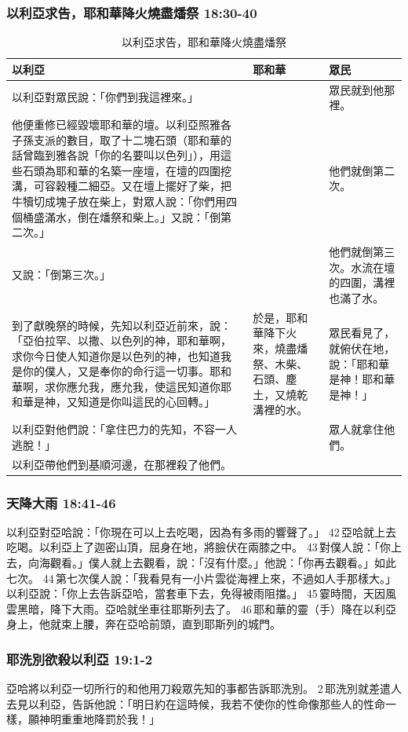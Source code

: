 \subsubsection{以利亞求告，耶和華降火燒盡燔祭 18:30-40}
\begin{table}[H]
\centering 
\begin{tabular}{p{10.5cm}|p{2.75cm}|p{4cm}}\hline\hline
以利亞&耶和華&眾民\\\hline
以利亞對眾民說：「你們到我這裡來。」&&眾民就到他那裡。\\\hline
他便重修已經毀壞耶和華的壇。以利亞照雅各子孫支派的數目，取了十二塊石頭（耶和華的話曾臨到雅各說「你的名要叫以色列」），用這些石頭為耶和華的名築一座壇，在壇的四圍挖溝，可容穀種二細亞。又在壇上擺好了柴，把牛犢切成塊子放在柴上，對眾人說：「你們用四個桶盛滿水，倒在燔祭和柴上。」又說：「倒第二次。」&&他們就倒第二次。\\\hline
又說：「倒第三次。」&&他們就倒第三次。水流在壇的四圍，溝裡也滿了水。\\\hline
到了獻晚祭的時候，先知以利亞近前來，說：「亞伯拉罕、以撒、以色列的神，耶和華啊，求你今日使人知道你是以色列的神，也知道我是你的僕人，又是奉你的命行這一切事。耶和華啊，求你應允我，應允我，使這民知道你耶和華是神，又知道是你叫這民的心回轉。」&於是，耶和華降下火來，燒盡燔祭、木柴、石頭、塵土，又燒乾溝裡的水。&眾民看見了，就俯伏在地，說：「耶和華是神！耶和華是神！」\\\hline
以利亞對他們說：「拿住巴力的先知，不容一人逃脫！」&&眾人就拿住他們。\\\hline
以利亞帶他們到基順河邊，在那裡殺了他們。&&\\\hline
\end{tabular}
\caption{以利亞求告，耶和華降火燒盡燔祭}
\end{table} 


\subsubsection{天降大雨 18:41-46} 
以利亞對亞哈說：「你現在可以上去吃喝，因為有多雨的響聲了。」 42 亞哈就上去吃喝。以利亞上了迦密山頂，屈身在地，將臉伏在兩膝之中。 43 對僕人說：「你上去，向海觀看。」僕人就上去觀看，說：「沒有什麼。」他說：「你再去觀看。」如此七次。 44 第七次僕人說：「我看見有一小片雲從海裡上來，不過如人手那樣大。」以利亞說：「你上去告訴亞哈，當套車下去，免得被雨阻擋。」 45 霎時間，天因風雲黑暗，降下大雨。亞哈就坐車往耶斯列去了。 46 耶和華的靈（手）降在以利亞身上，他就束上腰，奔在亞哈前頭，直到耶斯列的城門。

\subsubsection{耶洗別欲殺以利亞 19:1-2}
亞哈將以利亞一切所行的和他用刀殺眾先知的事都告訴耶洗別。 2 耶洗別就差遣人去見以利亞，告訴他說：「明日約在這時候，我若不使你的性命像那些人的性命一樣，願神明重重地降罰於我！」


